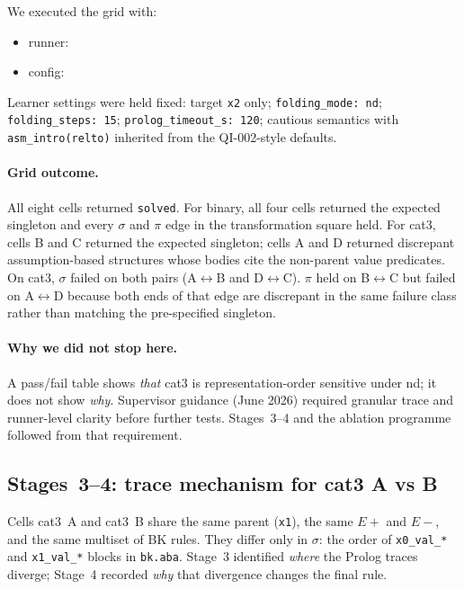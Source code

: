 \documentclass[11pt,a4paper]{article}
\begin{document}
We executed the grid with:
\begin{itemize}
  \item runner: 
  \item config: 
\end{itemize}
Learner settings were held fixed: target \texttt{x2} only; \texttt{folding\_mode: nd};
\texttt{folding\_steps: 15}; \texttt{prolog\_timeout\_s: 120}; cautious semantics with
\texttt{asm\_intro(relto)} inherited from the QI-002-style defaults.

\paragraph{Grid outcome.} All eight cells returned \texttt{solved}. For binary, all four cells
returned the expected singleton and every $\sigma$ and $\pi$ edge in the transformation square
held. For cat3, cells B and C returned the expected singleton; cells A and D returned
discrepant assumption-based structures whose bodies cite the non-parent value predicates. On
cat3, $\sigma$ failed on both pairs (A$\leftrightarrow$B and D$\leftrightarrow$C). $\pi$ held on
B$\leftrightarrow$C but failed on A$\leftrightarrow$D because both ends of that edge are
discrepant in the same failure class rather than matching the pre-specified singleton.

\paragraph{Why we did not stop here.} A pass/fail table shows \emph{that} cat3 is
representation-order sensitive under nd; it does not show \emph{why}. Supervisor guidance
(June 2026) required granular trace and runner-level clarity before further tests. Stages~3--4
and the ablation programme followed from that requirement.

\subsection{Stages~3--4: trace mechanism for cat3 A vs B}
\label{sec:mechanism}

Cells cat3~A and cat3~B share the same parent (\texttt{x1}), the same $E+$ and $E-$, and the
same multiset of BK rules. They differ only in $\sigma$: the order of \texttt{x0\_val\_*} and
\texttt{x1\_val\_*} blocks in \texttt{bk.aba}. Stage~3 identified \emph{where} the Prolog traces
diverge; Stage~4 recorded \emph{why} that divergence changes the final rule.
\end{document}

